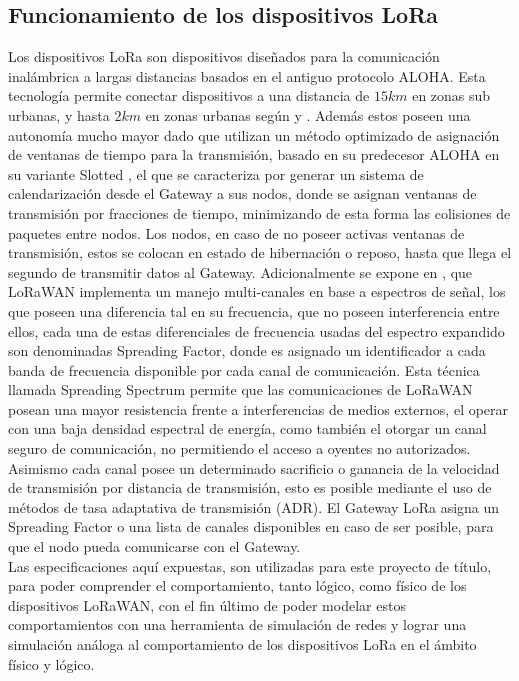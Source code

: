 \begin{justify}
\subsection{Funcionamiento de los dispositivos LoRa}
Los dispositivos LoRa son dispositivos diseñados para la comunicación inalámbrica a largas distancias basados en el antiguo protocolo ALOHA. Esta tecnología permite conectar dispositivos a una distancia de $15km$ en zonas sub urbanas, y hasta $2km$ en zonas urbanas según \cite{Sornin} y \cite{Sornin2}. Además estos poseen una autonomía mucho mayor dado que utilizan un método optimizado de asignación de ventanas de tiempo para la transmisión, basado en su predecesor ALOHA en su variante Slotted \cite{NORMAN}, el que se caracteriza por generar un sistema de calendarización desde el Gateway a sus nodos, donde se asignan ventanas de transmisión por fracciones de tiempo, minimizando de esta forma las colisiones de paquetes entre nodos. Los nodos, en caso de no poseer activas ventanas de transmisión, estos se colocan en estado de hibernación o reposo, hasta que llega el segundo de transmitir datos al Gateway. Adicionalmente se expone en \cite{modulation}, que LoRaWAN implementa un manejo multi-canales en base a espectros de señal, los que poseen una diferencia tal en su frecuencia, que no poseen interferencia entre ellos, cada una de estas diferenciales de frecuencia usadas del espectro expandido son denominadas Spreading Factor, donde es asignado un identificador a cada banda de frecuencia disponible por cada canal de comunicación. Esta técnica llamada Spreading Spectrum permite que las comunicaciones de LoRaWAN posean una mayor resistencia frente a interferencias de medios externos, el operar con una baja densidad espectral de energía, como también el otorgar un canal seguro de comunicación, no permitiendo el acceso a oyentes no autorizados. Asimismo cada canal posee un determinado sacrificio o ganancia de la velocidad de transmisión por distancia de transmisión, esto es posible mediante el uso de métodos de tasa adaptativa de transmisión (ADR). El Gateway LoRa asigna un Spreading Factor o una lista de canales disponibles en caso de ser posible, para que el nodo pueda comunicarse con el Gateway.\\
Las especificaciones aquí expuestas, son utilizadas para este proyecto de título, para poder comprender el comportamiento, tanto lógico, como físico de los dispositivos LoRaWAN, con el fin último de poder modelar estos comportamientos con una herramienta de simulación de redes y lograr una simulación análoga al comportamiento de los dispositivos LoRa en el ámbito físico y lógico.


\end{justify}
